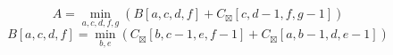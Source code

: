 \documentclass{article}
\begin{document}
$$ A =\min_{ a,c,d,f,g } \left( B\left[a,c,d,f\right]+C_{\boxtimes}\left[c,d-1,f,g-1\right]\right) $$
$$ B\left[ a,c,d,f \right] =\min_{ b,e } \left( C_{\boxtimes}\left[b,c-1,e,f-1\right]+C_{\boxtimes}\left[a,b-1,d,e-1\right]\right) $$
\end{document}
